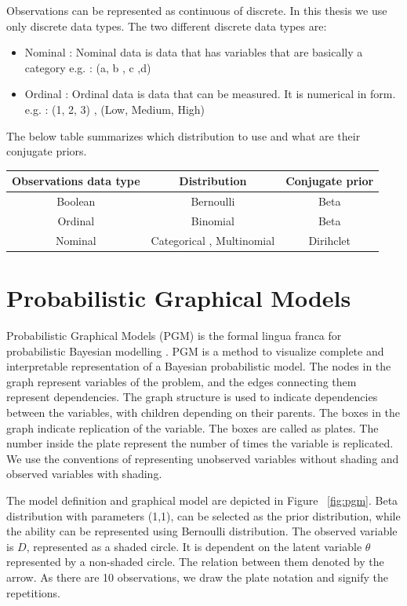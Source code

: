 Observations can be represented as continuous of discrete. In this thesis we use only discrete data types. The two different discrete data types are:
\begin{itemize}
	\item Nominal : Nominal data is data that has variables that are basically a category e.g. : (a, b , c ,d)
	\item Ordinal : Ordinal data is data that can be  measured. It is numerical in form. e.g. : (1, 2, 3) , (Low, Medium, High)
\end{itemize} 

The below table summarizes which distribution to use and what are their conjugate priors.

\begin{tabular}[htp]{|c|c|c|}
\hline
	\textbf{Observations data type} & \textbf{Distribution} & \textbf{Conjugate prior} \\
\hline
\hline
	Boolean & Bernoulli & Beta \\
\hline
	Ordinal & Binomial & Beta \\
\hline
	Nominal & Categorical , Multinomial & Dirihclet \\
\hline

\end{tabular}


\section{Probabilistic Graphical Models}

Probabilistic Graphical Models  (PGM) is the formal lingua franca for probabilistic Bayesian modelling \cite{Tenenbaum2008PP}. PGM is a method to visualize complete and interpretable representation of a Bayesian probabilistic model. The nodes in the graph represent variables of the problem, and the edges connecting them represent dependencies. The graph structure is used to indicate dependencies between the variables, with children depending on their parents. 
The boxes in the graph indicate replication of the variable. The boxes are called as plates. The number inside the plate represent the number of times the variable is replicated. We use the conventions of representing unobserved variables without shading and observed variables with shading.

The model definition and graphical model are depicted in Figure ~\ref{fig:pgm}. Beta distribution with parameters  (1,1), can be selected as the prior distribution, while the ability can be represented using Bernoulli distribution. 
 The observed variable is $D$, represented as a shaded circle. It is dependent on the latent variable $\theta$ represented by a non-shaded circle. The relation between them denoted by the arrow. As there are 10 observations, we draw the plate notation and signify the repetitions.

